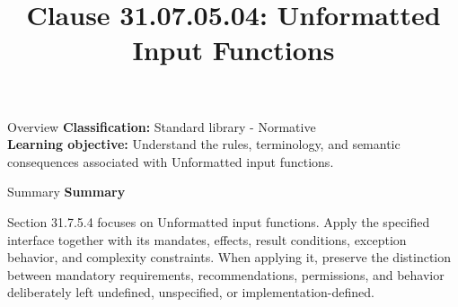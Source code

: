 \documentclass[10pt,letterpaper]{article}
\title{Clause 31.07.05.04: Unformatted Input Functions}
\author{}
\date{}
\begin{document}
\maketitle
\begin{CornellOverviewBox}{Overview}
\textbf{Classification:} Standard library - Normative\\[2pt]
\textbf{Learning objective:} Understand the rules, terminology, and semantic consequences associated with Unformatted input functions.
\end{CornellOverviewBox}\begin{CornellSummaryBox}{Summary}
{\sffamily\bfseries\color{Accent} Summary}\par\vspace{3pt}Section 31.7.5.4 focuses on Unformatted input functions. Apply the specified interface together with its mandates, effects, result conditions, exception behavior, and complexity constraints. When applying it, preserve the distinction between mandatory requirements, recommendations, permissions, and behavior deliberately left undefined, unspecified, or implementation-defined.
\end{CornellSummaryBox}
\end{document}
